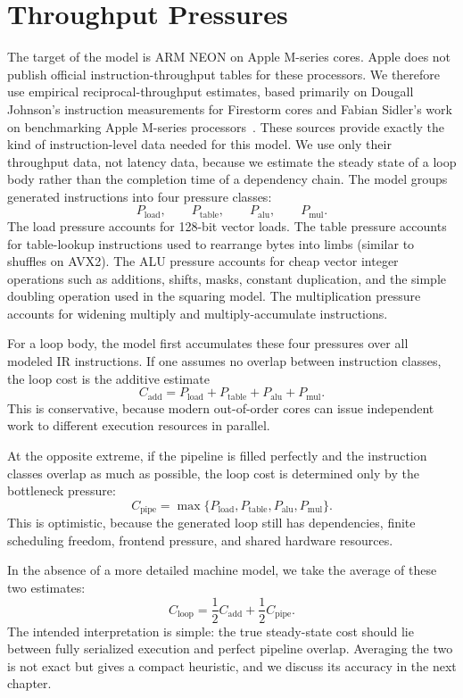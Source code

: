 \section{Throughput Pressures}
\label{sec:throughput-pressures}

The target of the model is ARM NEON on Apple M-series cores. Apple does not publish official instruction-throughput tables for these processors. We therefore use empirical reciprocal-throughput estimates, based primarily on Dougall Johnson's instruction measurements for Firestorm cores and Fabian Sidler's work on benchmarking Apple M-series processors~\cite{johnsonFirestormSimd,sidler2025mseries}. These sources provide exactly the kind of instruction-level data needed for this model. We use only their throughput data, not latency data, because we estimate the steady state of a loop body rather than the completion time of a dependency chain. The model groups generated instructions into four pressure classes:
\[
    P_{\mathrm{load}},\qquad
    P_{\mathrm{table}},\qquad
    P_{\mathrm{alu}},\qquad
    P_{\mathrm{mul}}.
\]
The load pressure accounts for 128-bit vector loads. The table pressure accounts for table-lookup instructions used to rearrange bytes into limbs (similar to shuffles on AVX2). The ALU pressure accounts for cheap vector integer operations such as additions, shifts, masks, constant duplication, and the simple doubling operation used in the squaring model. The multiplication pressure accounts for widening multiply and multiply-accumulate instructions.

For a loop body, the model first accumulates these four pressures over all modeled IR instructions. If one assumes no overlap between instruction classes, the loop cost is the additive estimate
\[
    C_{\mathrm{add}}
        =
        P_{\mathrm{load}}
        + P_{\mathrm{table}}
        + P_{\mathrm{alu}}
        + P_{\mathrm{mul}}.
\]
This is conservative, because modern out-of-order cores can issue independent work to different execution resources in parallel.

At the opposite extreme, if the pipeline is filled perfectly and the instruction classes overlap as much as possible, the loop cost is determined only by the bottleneck pressure:
\[
    C_{\mathrm{pipe}}
        =
        \max\{P_{\mathrm{load}},P_{\mathrm{table}},P_{\mathrm{alu}},P_{\mathrm{mul}}\}.
\]
This is optimistic, because the generated loop still has dependencies, finite scheduling freedom, frontend pressure, and shared hardware resources.

In the absence of a more detailed machine model, we take the average of these two estimates:
\[
    C_{\mathrm{loop}}
        =
        \frac{1}{2}C_{\mathrm{add}}
        +
        \frac{1}{2}C_{\mathrm{pipe}}.
\]
The intended interpretation is simple: the true steady-state cost should lie between fully serialized execution and perfect pipeline overlap. Averaging the two is not exact but gives a compact heuristic, and we discuss its accuracy in the next chapter.

